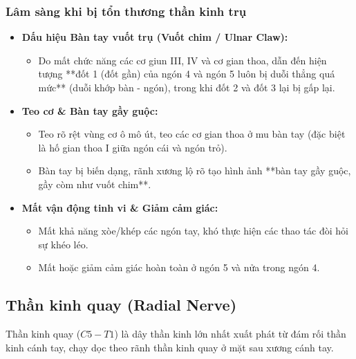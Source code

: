 \subsubsection{Lâm sàng khi bị tổn thương thần kinh trụ}
\begin{itemize}
    \item \textbf{Dấu hiệu Bàn tay vuốt trụ (Vuốt chim / Ulnar Claw):} 
    \begin{itemize}
        \item Do mất chức năng các cơ giun III, IV và cơ gian thoa, dẫn đến hiện tượng **đốt 1 (đốt gần) của ngón 4 và ngón 5 luôn bị duỗi thẳng quá mức** (duỗi khớp bàn - ngón), trong khi đốt 2 và đốt 3 lại bị gấp lại.
    \end{itemize}

    \item \textbf{Teo cơ \& Bàn tay gầy guộc:} 
    \begin{itemize}
        \item Teo rõ rệt vùng cơ ô mô út, teo các cơ gian thoa ở mu bàn tay (đặc biệt là hố gian thoa I giữa ngón cái và ngón trỏ).
        \item Bàn tay bị biến dạng, rãnh xương lộ rõ tạo hình ảnh **bàn tay gầy guộc, gầy còm như vuốt chim**.
    \end{itemize}

    \item \textbf{Mất vận động tinh vi \& Giảm cảm giác:}
    \begin{itemize}
        \item Mất khả năng xòe/khép các ngón tay, khó thực hiện các thao tác đòi hỏi sự khéo léo.
        \item Mất hoặc giảm cảm giác hoàn toàn ở ngón 5 và nửa trong ngón 4.
    \end{itemize}
\end{itemize}

\subsection{Thần kinh quay (Radial Nerve)}

Thần kinh quay ($C5 - T1$) là dây thần kinh lớn nhất xuất phát từ đám rối thần kinh cánh tay, chạy dọc theo rãnh thần kinh quay ở mặt sau xương cánh tay.

